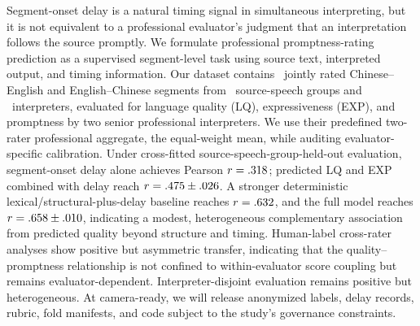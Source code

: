 Segment-onset delay is a natural timing signal in simultaneous interpreting, but it is not equivalent to a professional evaluator's judgment that an interpretation follows the source promptly. We formulate professional promptness-rating prediction as a supervised segment-level task using source text, interpreted output, and timing information. Our dataset contains \CohortN\ jointly rated Chinese--English and English--Chinese segments from \SpeechGroupN\ source-speech groups and \InterpreterN\ interpreters, evaluated for language quality (LQ), expressiveness (EXP), and promptness by two senior professional interpreters. We use their predefined two-rater professional aggregate, the equal-weight mean, while auditing evaluator-specific calibration. Under cross-fitted source-speech-group-held-out evaluation, segment-onset delay alone achieves Pearson $r=.318$; predicted LQ and EXP combined with delay reach $r=.475\pm.026$. A stronger deterministic lexical/structural-plus-delay baseline reaches $r=.632$, and the full model reaches $r=.658\pm.010$, indicating a modest, heterogeneous complementary association from predicted quality beyond structure and timing. Human-label cross-rater analyses show positive but asymmetric transfer, indicating that the quality--promptness relationship is not confined to within-evaluator score coupling but remains evaluator-dependent. Interpreter-disjoint evaluation remains positive but heterogeneous. At camera-ready, we will release anonymized labels, delay records, rubric, fold manifests, and code subject to the study's governance constraints.
